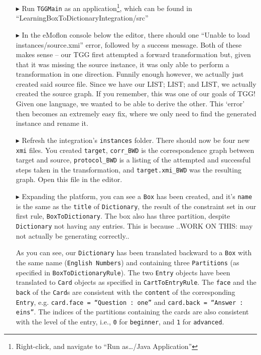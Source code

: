 \begin{itemize}
\item[$\blacktriangleright$] Run \texttt{TGGMain} as an application\footnote{Right-click, and navigate to ``Run as\ldots/Java Application''}, which can be found
in ``LearningBox\-To\-Dictionary\-In\-te\-gra\-tion\-/src''

\item[$\blacktriangleright$] In the eMoflon console below the editor, there should  one ``Unable to load instances/source.xmi'' error, followed by a success
message. Both of these makes sense -- our TGG first attempted a forward transformation but, given that it was missing the source instance, it was only able
to perform a transformation in one direction. Funnily enough however, we actually just created said source file. Since we have our LIST; LIST; and LIST, we
actually created the source graph. If you remember, this was one of our goals of TGG! Given one language, we wanted to be able to derive the other.  This
`error' then becomes an extremely easy fix, where we only need to find the generated instance and rename it.

\item[$\blacktriangleright$] Refresh the integration's \texttt{instances} folder. There should now be four new \texttt{xmi} files. You created \texttt{target},
\texttt{corr_BWD} is the correspondence graph between target and source, \texttt{protocol_BWD} is a listing of the attempted and successful steps taken in the
transformation, and \texttt{target.xmi_BWD} was the resulting graph. Open this file in the editor.

\item[$\blacktriangleright$] Expanding the platform, you can see a \texttt{Box} has been created, and it's \texttt{name} is the same as the \texttt{title} of
\texttt{Dictionary}, the result of the constraint set in our first rule, \texttt{BoxToDictionary}. The box also has three partition, despite
\texttt{Dictionary} not having any entries. This is because ..\update WORK ON THIS: may not actually be generating correctly..


As you can see, our \texttt{Dictionary} has been translated backward to a \texttt{Box} with the same name (\texttt{English Numbers}) and containing three
\texttt{Par\-ti\-tions} (as specified in \texttt{Box\-To\-Dictionary\-Rule}). The two \texttt{Entry} objects have been translated to \texttt{Card} objects as
specified in \texttt{CartToEntryRule}. The \texttt{face} and the \texttt{back} of the \texttt{Card}s are consistent with the \texttt{content}
of the corresponding \texttt{Entry}, e.g. \texttt{card.face = ``Question : one''} and \texttt{card.back = ``Answer : eins''}. The indices of the partitions
containing the cards are also consistent with the level of the entry, i.e., \texttt{0} for \texttt{beginner}, and \texttt{1} for \texttt{advanced}.


\end{itemize}
